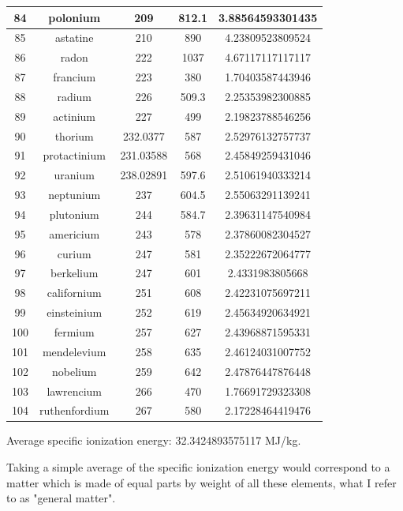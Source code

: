 \documentclass[a4paper]{article}
\begin{document}
\begin{center}
\begin{tabular}{|c|c|c|c|c|}
		\hline
		84 & polonium & 209 & 812.1 & 3.88564593301435 \\
		\hline
		85 & astatine & 210 & 890 & 4.23809523809524 \\
		\hline
		86 & radon & 222 & 1037 & 4.67117117117117 \\
		\hline
		87 & francium & 223 & 380 & 1.70403587443946 \\
		\hline
		88 & radium & 226 & 509.3 & 2.25353982300885 \\
		\hline
		89 & actinium & 227 & 499 & 2.19823788546256 \\
		\hline
		90 & thorium & 232.0377 & 587 & 2.52976132757737 \\
		\hline
		91 & protactinium & 231.03588 & 568 & 2.45849259431046 \\
		\hline
		92 & uranium & 238.02891 & 597.6 & 2.51061940333214 \\
		\hline
		93 & neptunium & 237 & 604.5 & 2.55063291139241 \\
		\hline
		94 & plutonium & 244 & 584.7 & 2.39631147540984 \\
		\hline
		95 & americium & 243 & 578 & 2.37860082304527 \\
		\hline
		96 & curium & 247 & 581 & 2.35222672064777 \\
		\hline
		97 & berkelium & 247 & 601 & 2.4331983805668 \\
		\hline
		98 & californium & 251 & 608 & 2.42231075697211 \\
		\hline
		99 & einsteinium & 252 & 619 & 2.45634920634921 \\
		\hline
		100 & fermium & 257 & 627 & 2.43968871595331 \\
		\hline
		101 & mendelevium & 258 & 635 & 2.46124031007752 \\
		\hline
		102 & nobelium & 259 & 642 & 2.47876447876448 \\
		\hline
		103 & lawrencium & 266 & 470 & 1.76691729323308 \\
		\hline
		104 & ruthenfordium & 267 & 580 & 2.17228464419476 \\
		\hline
	\end{tabular}
	\end{center}
	
	\normalsize
	
	Average specific ionization energy: 32.3424893575117 MJ/kg.
	
	\medskip
	
	Taking a simple average of the specific ionization energy would correspond to a matter which is made of equal parts by weight of all these elements, what I refer to as "general matter".
	
\end{document}

